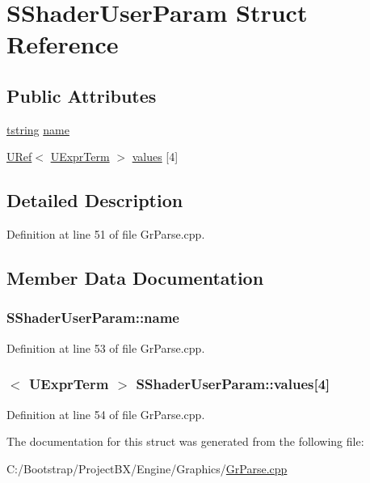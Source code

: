 \hypertarget{struct_s_shader_user_param}{
\section{SShaderUserParam Struct Reference}
\label{struct_s_shader_user_param}
}
\subsection*{Public Attributes}
\begin{CompactItemize}
\item 
\hyperlink{common__afx_8h_816fa58fd77499b0edb2c69ebe803d5c}{tstring} \hyperlink{struct_s_shader_user_param_971f2d4b67996515461b50a0b5a72a39}{name}
\item 
\hyperlink{class_u_ref}{URef}$<$ \hyperlink{class_u_expr_term}{UExprTerm} $>$ \hyperlink{struct_s_shader_user_param_4a4e66ee74f4ecbe1b069d70b9c5615d}{values} \mbox{[}4\mbox{]}
\end{CompactItemize}


\subsection{Detailed Description}


Definition at line 51 of file GrParse.cpp.

\subsection{Member Data Documentation}
\hypertarget{struct_s_shader_user_param_971f2d4b67996515461b50a0b5a72a39}{
\subsubsection[{name}]{ {\bf SShaderUserParam::name}}}
\label{struct_s_shader_user_param_971f2d4b67996515461b50a0b5a72a39}




Definition at line 53 of file GrParse.cpp.\hypertarget{struct_s_shader_user_param_4a4e66ee74f4ecbe1b069d70b9c5615d}{
\subsubsection[{values}]{$<$ {\bf UExprTerm} $>$ {\bf SShaderUserParam::values}\mbox{[}4\mbox{]}}}
\label{struct_s_shader_user_param_4a4e66ee74f4ecbe1b069d70b9c5615d}




Definition at line 54 of file GrParse.cpp.

The documentation for this struct was generated from the following file:\begin{CompactItemize}
\item 
C:/Bootstrap/ProjectBX/Engine/Graphics/\hyperlink{_gr_parse_8cpp}{GrParse.cpp}\end{CompactItemize}
